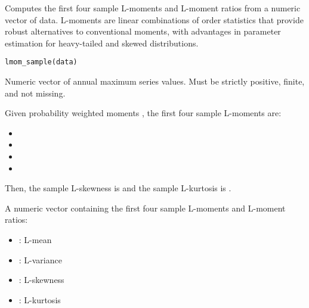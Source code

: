 \documentclass[a4paper]{book}
\begin{document}
%
\begin{Description}
Computes the first four sample L-moments and L-moment ratios from a numeric
vector of data. L-moments are linear combinations of order statistics that
provide robust alternatives to conventional moments, with advantages in
parameter estimation for heavy-tailed and skewed distributions.
\end{Description}
%
\begin{Usage}
\begin{verbatim}
lmom_sample(data)
\end{verbatim}
\end{Usage}
%
\begin{Arguments}
\begin{ldescription}
\item[\code{data}] Numeric vector of annual maximum series values.
Must be strictly positive, finite, and not missing.
\end{ldescription}
\end{Arguments}
%
\begin{Details}
Given probability weighted moments ,
the first four sample L-moments are:
\begin{itemize}

\item{} 
\item{} 
\item{} 
\item{} 

\end{itemize}


Then, the sample L-skewness is  and the sample L-kurtosis
is .
\end{Details}
%
\begin{Value}
A numeric vector containing the first four sample L-moments and L-moment ratios:
\begin{itemize}

\item{} : L-mean
\item{} : L-variance
\item{} : L-skewness
\item{} : L-kurtosis

\end{itemize}

\end{Value}
\end{document}
